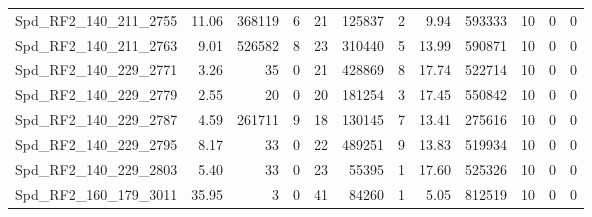 \begin{longtable}[c]{@{}lrrrrrrrrrrr@{}}
Spd\_RF2\_140\_211\_2755      & 11.06                  & 368119                  & 6                       & 21                     & 125837                  & 2                       & 9.94                    & 593333                   & 10                       & 0                        & 0                        \\
Spd\_RF2\_140\_211\_2763      & 9.01                   & 526582                  & 8                       & 23                     & 310440                  & 5                       & 13.99                   & 590871                   & 10                       & 0                        & 0                        \\
Spd\_RF2\_140\_229\_2771      & 3.26                   & 35                      & 0                       & 21                     & 428869                  & 8                       & 17.74                   & 522714                   & 10                       & 0                        & 0                        \\
Spd\_RF2\_140\_229\_2779      & 2.55                   & 20                      & 0                       & 20                     & 181254                  & 3                       & 17.45                   & 550842                   & 10                       & 0                        & 0                        \\
Spd\_RF2\_140\_229\_2787      & 4.59                   & 261711                  & 9                       & 18                     & 130145                  & 7                       & 13.41                   & 275616                   & 10                       & 0                        & 0                        \\
Spd\_RF2\_140\_229\_2795      & 8.17                   & 33                      & 0                       & 22                     & 489251                  & 9                       & 13.83                   & 519934                   & 10                       & 0                        & 0                        \\
Spd\_RF2\_140\_229\_2803      & 5.40                   & 33                      & 0                       & 23                     & 55395                   & 1                       & 17.60                   & 525326                   & 10                       & 0                        & 0                        \\
Spd\_RF2\_160\_179\_3011      & 35.95                  & 3                       & 0                       & 41                     & 84260                   & 1                       & 5.05                    & 812519                   & 10                       & 0                        & 0                        \\

\end{longtable}
